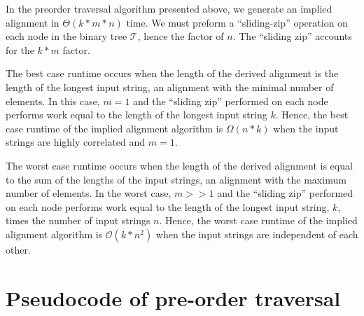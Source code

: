 \documentclass[11pt]{article}
\begin{document}
In the preorder traversal algorithm presented above, we generate an implied alignment in $\Theta(k * m * n)$ time.
We must preform a ``sliding-zip'' operation on each node in the binary tree $\mathcal{T}$, hence the factor of $n$.
The ``sliding zip'' accounts for the $k * m$ factor.

The best case runtime occurs when the length of the derived alignment is the length of the longest input string, an alignment with the minimal number of elements.
In this case, $m = 1$ and the ``sliding zip'' performed on each node performs work equal to the length of the longest input string $k$.
Hence, the best case runtime of the implied alignment algorithm is $\Omega(n*k)$ when the input strings are highly correlated and $m = 1$.

The worst case runtime occurs when the length of the derived alignment is equal to the sum of the lengths of the input strings, an alignment with the maximum number of elements.
In the worst case, $m >> 1$ and the ``sliding zip'' performed on each node performs work equal to the length of the longest input string, $k$, times the number of input strings $n$.
Hence, the worst case runtime of the implied alignment algorithm is $\mathcal{O}(k * n^2)$ when the input strings are independent of each other.



\section{Pseudocode of pre-order traversal}
\end{document}
